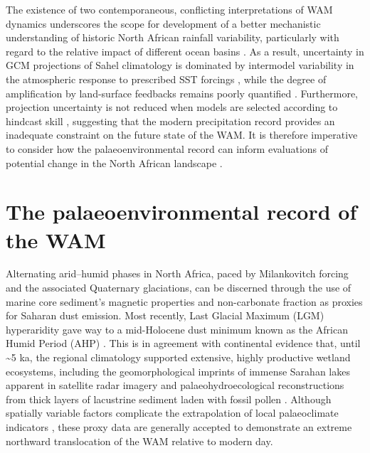 \documentclass[a4paper]{article}
\begin{document}
The existence of two contemporaneous, conflicting interpretations of WAM dynamics underscores the scope for development of a better mechanistic understanding of historic North African rainfall variability, particularly with regard to the relative impact of different ocean basins \parencite{lafore2011progress, roehrig2013present, nicholson2013west, rodriguez2015variability, martin2016understanding}.
As a result, uncertainty in GCM projections of Sahel climatology is dominated by intermodel variability in the atmospheric response to prescribed SST forcings \parencite{cook2006coupled, druyan2011studies, roehrig2013present, lee2014future, chadwick2016aspects}, while the degree of amplification by land-surface feedbacks remains poorly quantified \parencite{nicholson2000land, taylor2011new}. 
Furthermore, projection uncertainty is not reduced when models are selected according to hindcast skill \parencite{rowell2016can}, suggesting that the modern precipitation record provides an inadequate constraint on the future state of the WAM.
It is therefore imperative to consider how the palaeoenvironmental record can inform evaluations of potential change in the North African landscape \parencite{mohtadi2016palaeoclimatic}.

\section{The palaeoenvironmental record of the WAM}

Alternating arid--humid phases in North Africa, paced by Milankovitch forcing and the associated Quaternary glaciations, can be discerned through the use of marine core sediment's magnetic properties \parencite{bloemendal1989evidence, larrasoana2003three} and non-carbonate fraction \parencite{tiedemann1989climatic, tiedemann1994astronomic} as proxies for Saharan dust emission.
Most recently, Last Glacial Maximum (LGM) hyperaridity gave way to a mid-Holocene dust minimum known as the African Humid Period (AHP) \parencite{rea1994paleoclimatic, demenocal2000abrupt, adkins2006african}.
This is in agreement with continental evidence that, until \textasciitilde 5 ka, the regional climatology supported extensive, highly productive wetland ecosystems, including the geomorphological imprints of immense Sarahan lakes apparent in satellite radar imagery \parencite{schuster2005holocene, drake2006shorelines} and palaeohydroecological reconstructions from thick layers of lacustrine sediment laden with fossil pollen \parencite{ritchie1985sediment, lezine1990across, jolly1998biome}. 
Although spatially variable factors complicate the extrapolation of local palaeoclimate indicators \parencite{baumhauer1991palaeolakes}, these proxy data are generally accepted to demonstrate an extreme northward translocation of the WAM relative to modern day.
\end{document}
